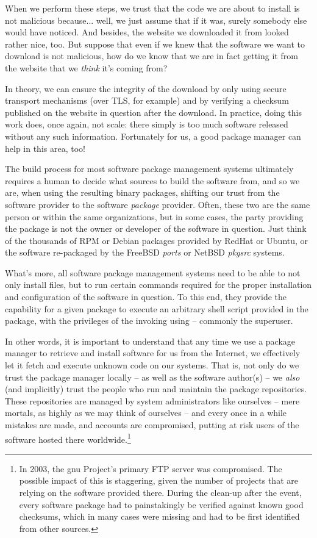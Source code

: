 When we perform these steps, we trust that the code we
are about to install is not malicious because... well,
we just assume that if it was, surely somebody else
would have noticed.  And besides, the website we
downloaded it from looked rather nice, too.  But
suppose that even if we knew that the software we want
to download is not malicious, how do we know that we
are in fact getting it from the website that we {\em
think} it's coming from?

In theory, we can ensure the integrity of the download
by only using secure transport mechanisms (over TLS,
for example) and by verifying a checksum published on
the website in question after the download.  In
practice, doing this work does, once again, not scale:
there simply is too much software released without any
such information.  Fortunately for us, a good package
manager can help in this area, too!

The build process for most software package management
systems ultimately requires a human to decide what
sources to build the software from, and so we are,
when using the resulting binary packages, shifting our
trust from the software provider to the software {\em
package} provider.  Often, these two are the same
person or within the same organizations, but in some
cases, the party providing the package is not the
owner or developer of the software in question.  Just
think of the thousands of RPM or Debian packages
provided by RedHat or
Ubuntu, or the software re-packaged by
the FreeBSD {\em ports} or NetBSD {\em pkgsrc}
systems.

What's more, all software package management systems
need to be able to not only install files, but to run
certain commands required for the proper installation
and configuration of the software in question.  To
this end, they provide the capability for a given
package to execute an arbitrary shell script provided
in the package, with the privileges of the invoking
using -- commonly the superuser.

In other words, it is important to understand that any
time we use a package manager to retrieve and install
software for us from the Internet, we effectively let
it fetch and execute unknown code on our systems.
That is, not only do we trust the package manager
locally -- as well as the software author(s) -- we {\em
also} (and implicitly) trust the people who run and
maintain the package repositories.  These repositories
are managed by system administrators like ourselves --
mere mortals, as highly as we may think of ourselves
-- and every once in a while mistakes are made, and
accounts are compromised, putting at risk users of the
software hosted there worldwide.\footnote{In 2003, the
\gls{gnu} Project's primary FTP server was
compromised.  The possible impact of this is
staggering, given the number of projects that are
relying on the software provided there.  During the
clean-up after the event, every software package had
to painstakingly be verified against known good
checksums, which in many cases were missing and had to
be first identified from other sources.}

